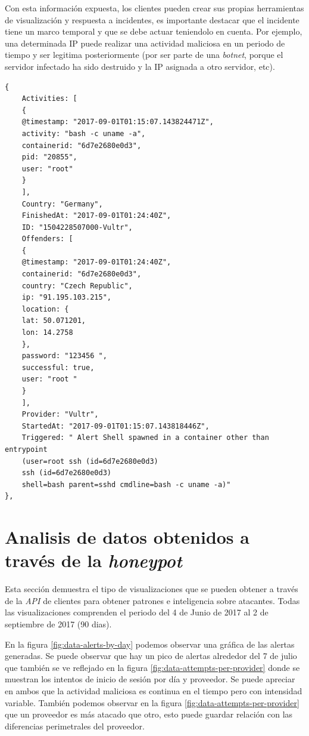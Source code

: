 Con esta información expuesta, los clientes pueden crear sus propias herramientas de visualización y respuesta a incidentes, es importante destacar que 
el incidente tiene un marco temporal y que se debe actuar teniendolo en cuenta. Por ejemplo, una determinada IP puede realizar una actividad maliciosa en un 
periodo de tiempo y ser legitima posteriormente (por ser parte de una \emph{botnet}, porque el servidor infectado ha sido destruido y la IP asignada a otro servidor, etc).

\begin{verbatim}    
{
    Activities: [
    {
    @timestamp: "2017-09-01T01:15:07.143824471Z",
    activity: "bash -c uname -a",
    containerid: "6d7e2680e0d3",
    pid: "20855",
    user: "root"
    }
    ],
    Country: "Germany",
    FinishedAt: "2017-09-01T01:24:40Z",
    ID: "1504228507000-Vultr",
    Offenders: [
    {
    @timestamp: "2017-09-01T01:24:40Z",
    containerid: "6d7e2680e0d3",
    country: "Czech Republic",
    ip: "91.195.103.215",
    location: {
    lat: 50.071201,
    lon: 14.2758
    },
    password: "123456 ",
    successful: true,
    user: "root "
    }
    ],
    Provider: "Vultr",
    StartedAt: "2017-09-01T01:15:07.143818446Z",
    Triggered: " Alert Shell spawned in a container other than entrypoint 
    (user=root ssh (id=6d7e2680e0d3) 
    ssh (id=6d7e2680e0d3) 
    shell=bash parent=sshd cmdline=bash -c uname -a)"
},
\end{verbatim}
\bigskip


\section{Analisis de datos obtenidos a través de la \emph{honeypot}}

Esta sección demuestra el tipo de visualizaciones que se pueden obtener a través de la \emph{API} de clientes para obtener
patrones e inteligencia sobre atacantes. Todas las visualizaciones comprenden el periodo del 4 de Junio de 2017 al 2 de septiembre de
2017 (90 dias).

En la figura \ref{fig:data-alerts-by-day} podemos observar una gráfica de las alertas generadas. Se puede observar que hay un pico de 
alertas alrededor del 7 de julio que también se ve reflejado en la figura \ref{fig:data-attempts-per-provider} donde se muestran
los intentos de inicio de sesión por día y proveedor.
    Se puede apreciar en ambos que la actividad maliciosa es continua en el tiempo pero con intensidad variable. También podemos observar
en la figura \ref{fig:data-attempts-per-provider} que un proveedor es más atacado que otro, esto puede guardar relación con las diferencias
perimetrales del proveedor.

